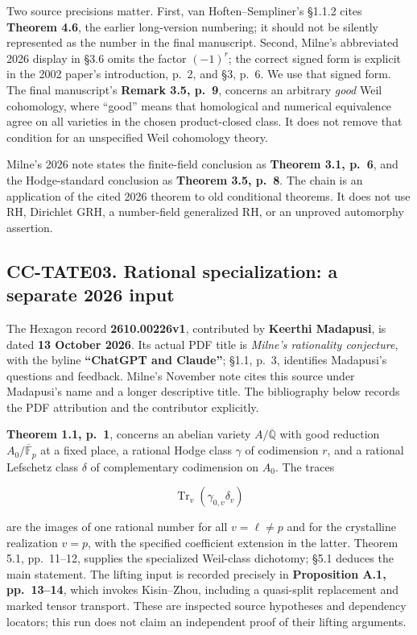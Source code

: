 \documentclass[11pt,a4paper]{article}
\theoremstyle{definition}\newtheorem{definition}[theorem]{Definition}
\theoremstyle{remark}\newtheorem{remark}[theorem]{Remark}
\begin{document}
Two source precisions matter. First, van Hoften--Sempliner's §1.1.2
cites \textbf{Theorem 4.6}, the earlier long-version numbering; it
should not be silently represented as the number in the final
manuscript. Second, Milne's abbreviated 2026 display in §3.6 omits the
factor \((-1)^r\); the correct signed form is explicit in the 2002
paper's introduction, p.~2, and §3, p.~6. We use that signed form. The
final manuscript's \textbf{Remark 3.5, p.~9}, concerns an arbitrary
\emph{good} Weil cohomology, where ``good'' means that homological and
numerical equivalence agree on all varieties in the chosen
product-closed class. It does not remove that condition for an
unspecified Weil cohomology theory.

Milne's 2026 note states the finite-field conclusion as \textbf{Theorem
3.1, p.~6}, and the Hodge-standard conclusion as \textbf{Theorem 3.5,
p.~8}. The chain is an application of the cited 2026 theorem to old
conditional theorems. It does not use RH, Dirichlet GRH, a number-field
generalized RH, or an unproved automorphy assertion.

\subsection{CC-TATE03. Rational specialization: a separate 2026
input}\label{cc-tate03.-rational-specialization-a-separate-2026-input}

The Hexagon record \textbf{2610.00226v1}, contributed by \textbf{Keerthi
Madapusi}, is dated \textbf{13 October 2026}. Its actual PDF title is
\emph{Milne's rationality conjecture}, with the byline \textbf{``ChatGPT
and Claude''}; §1.1, p.~3, identifies Madapusi's questions and feedback.
Milne's November note cites this source under Madapusi's name and a
longer descriptive title. The bibliography below records the PDF
attribution and the contributor explicitly.

\textbf{Theorem 1.1, p.~1}, concerns an abelian variety
\(A/\overline{\mathbb Q}\) with good reduction
\(A_0/\overline{\mathbb F}_p\) at a fixed place, a rational Hodge class
\(\gamma\) of codimension \(r\), and a rational Lefschetz class
\(\delta\) of complementary codimension on \(A_0\). The traces

\[
\operatorname{Tr}_v(\gamma_{0,v}\delta_v)
\]

are the images of one rational number for all \(v=\ell\ne p\) and for
the crystalline realization \(v=p\), with the specified coefficient
extension in the latter. Theorem 5.1, pp.~11--12, supplies the
specialized Weil-class dichotomy; §5.1 deduces the main statement. The
lifting input is recorded precisely in \textbf{Proposition A.1,
pp.~13--14}, which invokes Kisin--Zhou, including a quasi-split
replacement and marked tensor transport. These are inspected source
hypotheses and dependency locators; this run does not claim an
independent proof of their lifting arguments.
\end{document}
